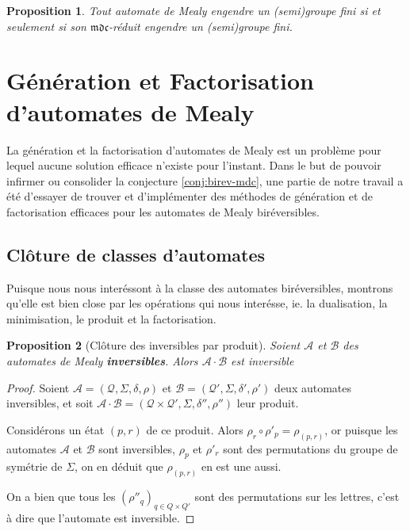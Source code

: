 \documentclass[11pt,a4paper]{article}
\newtheorem{prop}{Proposition}
\begin{document}
\begin{prop}
  Tout automate de Mealy engendre un (semi)groupe fini si et seulement si son $\mathfrak{mdc}$-réduit engendre un (semi)groupe fini.
\end{prop}

\section{Génération et Factorisation d'automates de Mealy}
La génération et la factorisation d'automates de Mealy est un problème pour lequel aucune solution efficace n'existe pour l'instant. Dans le but de pouvoir infirmer ou consolider la conjecture \ref{conj:birev-mdc}, une partie de notre travail a été d'essayer de trouver et d'implémenter des méthodes de génération et de factorisation efficaces pour les automates de Mealy biréversibles.


\subsection{Clôture de classes d'automates}

Puisque nous nous interéssont à la classe des automates biréversibles, montrons qu'elle est bien close par les opérations qui nous interésse, ie. la dualisation, la minimisation, le produit et la factorisation.

\begin{prop}[Clôture des inversibles par produit]
  Soient $\mathcal{A}$ et $\mathcal{B}$ des automates de Mealy \textbf{inversibles}. Alors $\mathcal{A}\cdot\mathcal{B}$ est inversible
\end{prop}

\begin{proof}
  Soient $\mathcal{A}=\left(\mathcal{Q}, \Sigma, \delta, \rho\right)$ et $\mathcal{B}=\left(\mathcal{Q'}, \Sigma, \delta', \rho'\right)$ deux automates inversibles, et soit $\mathcal{A\cdot B}=\left(\mathcal{Q\times Q'}, \Sigma, \delta'', \rho''\right)$ leur produit.


  Considérons un état $(p, r)$ de ce produit. Alors $\rho_r\circ\rho'_p=\rho_{(p,r)}$, or puisque les automates $\mathcal{A}$ et $\mathcal{B}$ sont inversibles, $\rho_p$ et $\rho'_r$ sont des permutations du groupe de symétrie de $\Sigma$, on en déduit que $\rho_{(p, r)}$ en est une aussi.

  On a bien que tous les ${(\rho''_q)}_{q\in Q\times Q'}$ sont des permutations sur les lettres, c'est à dire que l'automate est inversible.
\end{proof}
\end{document}
